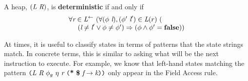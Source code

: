 \begin{definition}
A heap, $(\emph{L}\ \emph{R})$, is \textbf{deterministic} if and only if 
\[
\begin{array}{l}
\forall \cfgnt{r} \in \cfgnt{L}^\leftarrow\ (\forall (\phi\ \cfgnt{l}),(\phi^\prime\ \cfgnt{l}^\prime) \in \cfgnt{L}(r)\ (\\
\ \ \ \ (\cfgnt{l} \neq \cfgnt{l}^\prime \vee \phi \neq \phi^\prime) \Rightarrow (\phi \wedge \phi^\prime = \cfgt{false}))
\end{array}
\]
\end{definition}

%

%

At times, it is useful to classify states in terms of patterns that the state strings match. In concrete terms, this is similar to asking what will be the next instruction to execute. For example, we know that left-hand states matching the pattern $ \lp \cfgnt{L}\ \cfgnt{R}\ \phi_g\ \eta\ \cfgnt{r}\ \lp \cfgt{*}\ \cfgt{\$}\ \cfgnt{f} \rightarrow \cfgnt{k}\rp \rp$ only appear in the Field Access rule.

